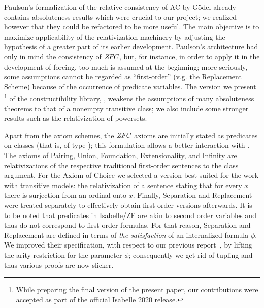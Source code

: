 Paulson's formalization \cite{paulson_2003} of the relative
consistency of AC by Gödel \cite{godel-L} already contains
absoluteness results which were crucial to our project; we realized
however that they could be refactored to be more useful. The main
objective is to maximize applicability of the relativization machinery
by adjusting the hypothesis of a greater part of its earlier
development. Paulson's architecture had only in mind the consistency
of $\mathit{ZFC}$, but, for instance, in order to apply it in the development
of forcing, too much is assumed at the beginning; more seriously, some
assumptions cannot be regarded as ``first-order'' (v.g. the
Replacement Scheme) because of the occurrence of predicate variables.
The version we present%
\footnote{%
  While preparing the final version of the present paper,
  our contributions were
  accepted as part of the official Isabelle 2020 release.
}
of the constructibility library,
, weakens the assumptions of many
absoluteness theorems to that of a nonempty transitive class; we also
include some stronger results such as the relativization of powersets.

Apart from the axiom schemes, the $\mathit{ZFC}$ axioms are initially stated
as predicates on classes (that is, of type
); this formulation
allows a better interaction with .  The axioms
of Pairing, Union, Foundation, Extensionality, and Infinity are
relativizations of the respective traditional first-order sentences to
the class argument. For the Axiom of Choice we selected a version best
suited for the work with transitive models: the relativization of a
sentence stating that for every $x$ there is surjection from an
ordinal onto $x$. Finally, Separation and Replacement were treated
separately to effectively obtain first-order versions afterwards. It
is to be noted that predicates in Isabelle/ZF are akin to second order
variables and thus do not correspond to first-order formulas.
For that reason, Separation and Replacement are defined in terms of
\emph{the satisfaction} of an internalized formula $\phi$.  We improved their
specification, with respect to our previous
report~\cite{2019arXiv190103313G}, by lifting the arity restriction
for the parameter $\phi$; consequently we get rid of tupling and thus
various proofs are now slicker.

